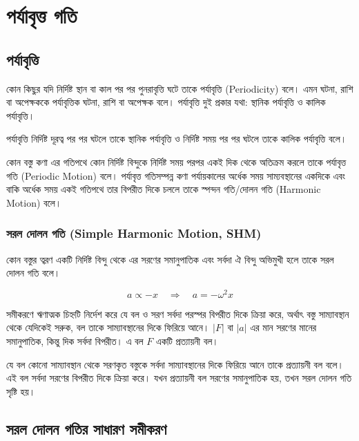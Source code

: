 \chapter{পর্যাবৃত্ত গতি}

\section{পর্যাবৃত্তি}

কোন কিছুর যদি নির্দিষ্ট স্থান বা কাল পর পর পুনরাবৃত্তি ঘটে তাকে পর্যাবৃত্তি \textenglish{(Periodicity)} বলে। এমন ঘটনা, রাশি বা অপেক্ষককে পর্যাবৃত্তিক ঘটনা, রাশি বা অপেক্ষক বলে। পর্যাবৃত্তি দুই প্রকার যথা: স্থানিক পর্যাবৃত্তি ও কালিক পর্যাবৃত্তি।

পর্যাবৃত্তি নির্দিষ্ট দূরত্ব পর পর ঘটলে তাকে স্থানিক পর্যাবৃত্তি ও নির্দিষ্ট সময় পর পর ঘটলে তাকে কালিক পর্যাবৃত্তি বলে।

কোন বস্তু কণা এর গতিপথে কোন নির্দিষ্ট বিন্দুকে নির্দিষ্ট সময় পরপর একই দিক থেকে অতিক্রম করলে তাকে পর্যাবৃত্ত গতি \textenglish{(Periodic Motion)} বলে। পর্যাবৃত্ত গতিসম্পন্ন কণা পর্যায়কালের অর্ধেক সময় সাম্যবস্থানের একদিকে এবং বাকি অর্ধেক সময় একই গতিপথে তার বিপরীত দিকে চললে তাকে স্পন্দন গতি/দোলন গতি \textenglish{(Harmonic Motion)} বলে।

\subsection{সরল দোলন গতি \textenglish{(Simple Harmonic Motion, SHM)}}

কোন বস্তুর ত্বরণ একটি নির্দিষ্ট বিন্দু থেকে এর সরণের সমানুপাতিক এবং সর্বদা ঐ বিন্দু অভিমুখী হলে তাকে সরল দোলন গতি বলে।

\begin{equation}
    a \propto -x \quad \Rightarrow \quad a = -\omega^2 x
\end{equation}

সমীকরণে ঋণাত্মক চিহ্নটি নির্দেশ করে যে বল ও সরণ সর্বদা পরস্পর বিপরীত দিকে ক্রিয়া করে, অর্থাৎ বস্তু সাম্যাবস্থান থেকে যেদিকেই সরুক, বল তাকে সাম্যাবস্থানের দিকে ফিরিয়ে আনে। $|F|$ বা $|a|$ এর মান সরণের মানের সমানুপাতিক, কিন্তু দিক সর্বদা বিপরীত। এ বল $F$ একটি প্রত্যায়নী বল।

যে বল কোনো সাম্যাবস্থান থেকে সরণকৃত বস্তুকে সর্বদা সাম্যাবস্থানের দিকে ফিরিয়ে আনে তাকে প্রত্যায়নী বল বলে। এই বল সর্বদা সরণের বিপরীত দিকে ক্রিয়া করে। যখন প্রত্যায়নী বল সরণের সমানুপাতিক হয়, তখন সরল দোলন গতি সৃষ্টি হয়।

\section{সরল দোলন গতির সাধারণ সমীকরণ}

